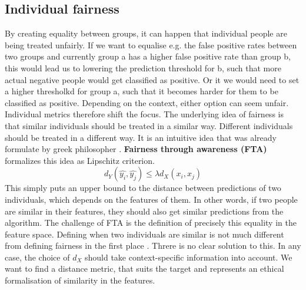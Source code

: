 \subsection*{Individual fairness}
By creating equality between groups, it can happen that individual people are being treated unfairly. If we want to equalise e.g. the false positive rates between two groups and currently group a has a higher false positive rate than group b, this would lead us to lowering the prediction threshold for b, such that more actual negative people would get classified as positive. Or it we would need to set a higher thresholkd for group a, such that it becomes harder for them to be classified as positive. Depending on the context, either option can seem unfair. Individual metrics therefore shift the focus. The underlying idea of fairness is that similar individuals should be treated in a similar way. Different individuals should be treated in a different way. It is an intuitive idea that was already formulate by greek philosopher {\color{red}{bothmann citation}}.
\textbf{Fairness through awareness (FTA)} formalizes this idea as Lipschitz criterion. $$d_Y(\hat{y_i}, \hat{y_j}) \leq \lambda {d_X}(x_i, x_j)$$
This simply puts an upper bound to the distance between predictions of two individuals, which depends on the features of them. In other words, if two people are similar in their features, they should also get similar predictions from the algorithm. The challenge of FTA is the definition of precisely this equality in the feature space. Defining when two individuals are similar is not much different from defining fairness in the first place \cite{castelnovo2022}. 
Threre is no clear solution to this. In any case, the choice of $d_X$ should take context-specific information into account. We want to find a distance metric, that suits the target and represents an ethical formalisation of similarity in the features.


